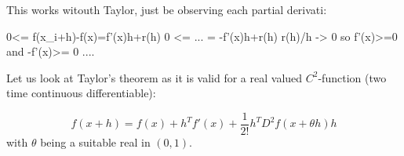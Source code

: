 \documentclass[17pt]{extarticle}
\begin{document}
	This works witouth Taylor, just be observing each partial derivati:
	
0<=	f(x_i+h)-f(x)=f'(x)h+r(h)
0 <= ... = -f'(x)h+r(h)
r(h)/h -> 0
so  f'(x)>=0 and -f'(x)>= 0
....
	
Let us look at Taylor's theorem as it is valid for a real valued $C^2$-function (two time continuous differentiable):

$$
f(x+h)=f(x)+h^T f'(x)+\frac{1}{2!}h^{T}D^2f(x+\theta h)h
$$
with $\theta$ being a suitable real in $(0,1)$.
\end{document}
